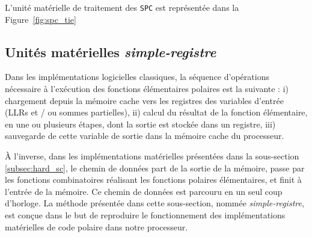 L'unité matérielle de traitement des \noeuds \texttt{SPC} est représentée dans la Figure~\ref{fig:spc_tie}

\subsection{Unités matérielles \textit{simple-registre}}

Dans les implémentations logicielles classiques, la séquence d'opérations nécessaire à l'exécution des fonctions élémentaires polaires est la suivante : i) chargement depuis la mémoire cache vers les registres des variables d'entrée (LLRs et / ou sommes partielles), ii) calcul du résultat de la fonction élémentaire, en une ou plusieurs étapes, dont la sortie est stockée dans un registre, iii) sauvegarde de cette variable de sortie dans la mémoire cache du processeur.

\`A l'inverse, dans les implémentations matérielles présentées dans la sous-section \ref{subsec:hard_sc}, le chemin de données part de la sortie de la mémoire, passe par les fonctions combinatoires réalisant les fonctions polaires élémentaires, et finit à l'entrée de la mémoire. Ce chemin de données est parcouru en un seul coup d'horloge. La méthode présentée dans cette sous-section, nommée \textit{simple-registre}, est conçue dans le but de reproduire le fonctionnement des implémentations matérielles de code polaire dans notre processeur.

